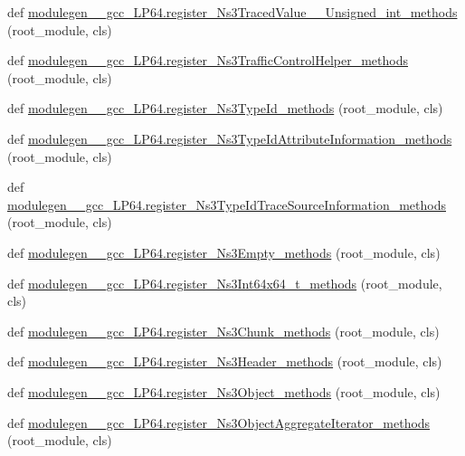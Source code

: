 \begin{DoxyCompactItemize}
\item 
def \hyperlink{namespacemodulegen____gcc__LP64_af843944fc0315c1a343b30351d5dd3a5}{modulegen\+\_\+\+\_\+gcc\+\_\+\+L\+P64.\+register\+\_\+\+Ns3\+Traced\+Value\+\_\+\+\_\+\+Unsigned\+\_\+int\+\_\+methods} (root\+\_\+module, cls)
\item 
def \hyperlink{namespacemodulegen____gcc__LP64_a7f22a0eeff11e091ff48b3784f09cdc0}{modulegen\+\_\+\+\_\+gcc\+\_\+\+L\+P64.\+register\+\_\+\+Ns3\+Traffic\+Control\+Helper\+\_\+methods} (root\+\_\+module, cls)
\item 
def \hyperlink{namespacemodulegen____gcc__LP64_adea84ddbc489895d2347d15ea1328bc0}{modulegen\+\_\+\+\_\+gcc\+\_\+\+L\+P64.\+register\+\_\+\+Ns3\+Type\+Id\+\_\+methods} (root\+\_\+module, cls)
\item 
def \hyperlink{namespacemodulegen____gcc__LP64_aae2764584a69687644f37b42586364df}{modulegen\+\_\+\+\_\+gcc\+\_\+\+L\+P64.\+register\+\_\+\+Ns3\+Type\+Id\+Attribute\+Information\+\_\+methods} (root\+\_\+module, cls)
\item 
def \hyperlink{namespacemodulegen____gcc__LP64_af7ee3e03193815233627c2c4b4b2ebf6}{modulegen\+\_\+\+\_\+gcc\+\_\+\+L\+P64.\+register\+\_\+\+Ns3\+Type\+Id\+Trace\+Source\+Information\+\_\+methods} (root\+\_\+module, cls)
\item 
def \hyperlink{namespacemodulegen____gcc__LP64_af245edb84966d4b4c48221a31647be89}{modulegen\+\_\+\+\_\+gcc\+\_\+\+L\+P64.\+register\+\_\+\+Ns3\+Empty\+\_\+methods} (root\+\_\+module, cls)
\item 
def \hyperlink{namespacemodulegen____gcc__LP64_a1239c8a15c3a5d5ac5184bd53add8029}{modulegen\+\_\+\+\_\+gcc\+\_\+\+L\+P64.\+register\+\_\+\+Ns3\+Int64x64\+\_\+t\+\_\+methods} (root\+\_\+module, cls)
\item 
def \hyperlink{namespacemodulegen____gcc__LP64_ad963bb0d3bc0910b7d8b5a1818803799}{modulegen\+\_\+\+\_\+gcc\+\_\+\+L\+P64.\+register\+\_\+\+Ns3\+Chunk\+\_\+methods} (root\+\_\+module, cls)
\item 
def \hyperlink{namespacemodulegen____gcc__LP64_a3c6ef29ba074be124c68037155fe7cbe}{modulegen\+\_\+\+\_\+gcc\+\_\+\+L\+P64.\+register\+\_\+\+Ns3\+Header\+\_\+methods} (root\+\_\+module, cls)
\item 
def \hyperlink{namespacemodulegen____gcc__LP64_a37449428b6bb64d5e534ebe801291a86}{modulegen\+\_\+\+\_\+gcc\+\_\+\+L\+P64.\+register\+\_\+\+Ns3\+Object\+\_\+methods} (root\+\_\+module, cls)
\item 
def \hyperlink{namespacemodulegen____gcc__LP64_ab66e5c7d4bfc0a0524b69d37ef0bbb53}{modulegen\+\_\+\+\_\+gcc\+\_\+\+L\+P64.\+register\+\_\+\+Ns3\+Object\+Aggregate\+Iterator\+\_\+methods} (root\+\_\+module, cls)

\end{DoxyCompactItemize}
